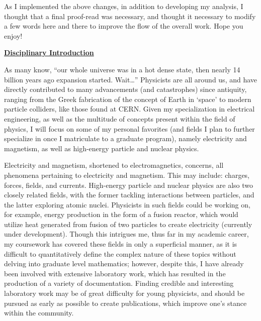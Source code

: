 \begin{tcolorbox}
\begin{justify}
  \hspace{.5in} As I implemented the above changes, in addition to developing my analysis, I thought that a final proof-read was necessary, and thought it necessary to modify a few words here and there to improve the flow of the overall work. Hope you enjoy!

\end{justify}

\end{tcolorbox}

\begin{center}

  \textbf{\underline{Disciplinary Introduction}}

\end{center}

\begin{justify}

  \hspace{.5in} As many know, ``our whole universe was in a hot dense state, then nearly 14 billion years ago expansion started. Wait\ldots'' Physicists are all around us, and have directly contributed to many advancements (and catastrophes) since antiquity, ranging from the Greek fabrication of the concept of Earth in `space' to modern particle colliders, like those found at CERN. Given my specialization in electrical engineering, as well as the multitude of concepts present within the field of physics, I will focus on some of my personal favorites (and fields I plan to further specialize in once I matriculate to a graduate program), namely electricity and magnetism, as well as high-energy particle and nuclear physics.

  \hspace{.5in} Electricity and magnetism, shortened to electromagnetics, concerns, all phenomena pertaining to electricity and magnetism. This may include: charges, forces, fields, and currents. High-energy particle and nuclear physics are also two closely related fields, with the former tackling interactions between particles, and the latter exploring atomic nuclei. Physicists in such fields could be working on, for example, energy production in the form of a fusion reactor, which would utilize heat generated from fusion of two particles to create electricity (currently under development). Though this intrigues me, thus far in my academic career, my coursework has covered these fields in only a superficial manner, as it is difficult to quantitatively define the complex nature of these topics without delving into graduate level mathematics; however, despite this, I have already been involved with extensive laboratory work, which has resulted in the production of a variety of documentation. Finding credible and interesting laboratory work may be of great difficulty for young physicists, and should be pursued as early as possible to create publications, which improve one's stance within the community.


\end{justify}
